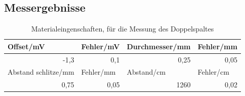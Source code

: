 \documentclass[12pt]{scrartcl}
\begin{document}
\subsection{Messergebnisse}

\begin{table}[H]
\caption{Materialeingenschaften, für die Messung des Doppelspaltes}
\begin{center}
\begin{tabular}{|l|l|l|l|}
\hline
Offset/mV & Fehler/mV & Durchmesser/mm & Fehler/mm \\ \hline
\multicolumn{1}{|r|}{-1,3} & \multicolumn{1}{|r|}{0,1} & \multicolumn{1}{r|}{0,25} & \multicolumn{1}{r|}{0,05} \\ \hline
Abstand schlitze/mm & Fehler/mm & Abstand/cm & Fehler/cm \\ \hline
\multicolumn{1}{|r|}{0,75} & \multicolumn{1}{r|}{0,05} & \multicolumn{1}{r|}{1260} & \multicolumn{1}{r|}{0,02} \\ \hline
\end{tabular}
\end{center}
\label{tab:a_3_e}
\end{table}
\end{document}
